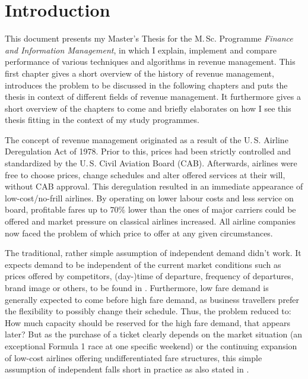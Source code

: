 \chapter{Introduction}

This document presents my Master's Thesis for the M.\,Sc.\xspace Programme \emph{Finance and Information Management}, in which I explain, implement and compare performance of various techniques and algorithms in revenue management. This first chapter gives a short overview of the history of revenue management, introduces the problem to be discussed in the following chapters and puts the thesis in context of different fields of revenue management. It furthermore gives a short overview of the chapters to come and briefly elaborates on how I see this thesis fitting in the context of my study programmes.

The concept of revenue management originated as a result of the U.\,S.\xspace Airline Deregulation Act of 1978. Prior to this, prices had been strictly controlled and standardized by the U.\,S.\xspace Civil Aviation Board (CAB\nomenclature{CAB}{U.\,S.\xspace Civil Aviation Board}). Afterwards, airlines were free to choose prices, change schedules and alter offered services at their will, without CAB approval. This deregulation resulted in an immediate appearance of low-cost/no-frill airlines. By operating on lower labour costs and less service on board, profitable fares up to $70 \%$ lower than the ones of major carriers could be offered and market pressure on classical airlines increased. All airline companies now faced the problem of which price to offer at any given circumstances. 

The traditional, rather simple assumption of independent demand didn't work. It expects demand to be independent of the current market conditions such as prices offered by competitors, (day-)time of departure, frequency of departures, brand image or others, to be found in \eg \cite{Talluri.2005}. Furthermore, low fare demand is generally expected to come before high fare demand, as business travellers prefer the flexibility to possibly change their schedule. Thus, the problem reduced to: How much capacity should be reserved for the high fare demand, that appears later? But as the purchase of a ticket clearly depends on the market situation (\eg an exceptional Formula 1 race at one specific weekend) or the continuing expansion of low-cost airlines offering undifferentiated fare structures, this simple assumption of independent falls short in practice as also stated in \cite{Bront.2009}.

